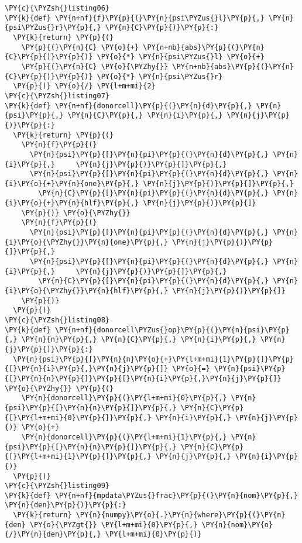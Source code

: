 \begin{Verbatim}[commandchars=\\\{\}]
\PY{c}{\PYZsh{}listing06}
\PY{k}{def} \PY{n+nf}{f}\PY{p}{(}\PY{n}{psi\PYZus{}l}\PY{p}{,} \PY{n}{psi\PYZus{}r}\PY{p}{,} \PY{n}{C}\PY{p}{)}\PY{p}{:}
  \PY{k}{return} \PY{p}{(}
    \PY{p}{(}\PY{n}{C} \PY{o}{+} \PY{n+nb}{abs}\PY{p}{(}\PY{n}{C}\PY{p}{)}\PY{p}{)} \PY{o}{*} \PY{n}{psi\PYZus{}l} \PY{o}{+} 
    \PY{p}{(}\PY{n}{C} \PY{o}{\PYZhy{}} \PY{n+nb}{abs}\PY{p}{(}\PY{n}{C}\PY{p}{)}\PY{p}{)} \PY{o}{*} \PY{n}{psi\PYZus{}r}
  \PY{p}{)} \PY{o}{/} \PY{l+m+mi}{2}
\PY{c}{\PYZsh{}listing07}
\PY{k}{def} \PY{n+nf}{donorcell}\PY{p}{(}\PY{n}{d}\PY{p}{,} \PY{n}{psi}\PY{p}{,} \PY{n}{C}\PY{p}{,} \PY{n}{i}\PY{p}{,} \PY{n}{j}\PY{p}{)}\PY{p}{:}
  \PY{k}{return} \PY{p}{(}
    \PY{n}{f}\PY{p}{(}
      \PY{n}{psi}\PY{p}{[}\PY{n}{pi}\PY{p}{(}\PY{n}{d}\PY{p}{,} \PY{n}{i}\PY{p}{,}     \PY{n}{j}\PY{p}{)}\PY{p}{]}\PY{p}{,} 
      \PY{n}{psi}\PY{p}{[}\PY{n}{pi}\PY{p}{(}\PY{n}{d}\PY{p}{,} \PY{n}{i}\PY{o}{+}\PY{n}{one}\PY{p}{,} \PY{n}{j}\PY{p}{)}\PY{p}{]}\PY{p}{,} 
        \PY{n}{C}\PY{p}{[}\PY{n}{pi}\PY{p}{(}\PY{n}{d}\PY{p}{,} \PY{n}{i}\PY{o}{+}\PY{n}{hlf}\PY{p}{,} \PY{n}{j}\PY{p}{)}\PY{p}{]}
    \PY{p}{)} \PY{o}{\PYZhy{}} 
    \PY{n}{f}\PY{p}{(}
      \PY{n}{psi}\PY{p}{[}\PY{n}{pi}\PY{p}{(}\PY{n}{d}\PY{p}{,} \PY{n}{i}\PY{o}{\PYZhy{}}\PY{n}{one}\PY{p}{,} \PY{n}{j}\PY{p}{)}\PY{p}{]}\PY{p}{,} 
      \PY{n}{psi}\PY{p}{[}\PY{n}{pi}\PY{p}{(}\PY{n}{d}\PY{p}{,} \PY{n}{i}\PY{p}{,}     \PY{n}{j}\PY{p}{)}\PY{p}{]}\PY{p}{,} 
        \PY{n}{C}\PY{p}{[}\PY{n}{pi}\PY{p}{(}\PY{n}{d}\PY{p}{,} \PY{n}{i}\PY{o}{\PYZhy{}}\PY{n}{hlf}\PY{p}{,} \PY{n}{j}\PY{p}{)}\PY{p}{]}
    \PY{p}{)} 
  \PY{p}{)}
\PY{c}{\PYZsh{}listing08}
\PY{k}{def} \PY{n+nf}{donorcell\PYZus{}op}\PY{p}{(}\PY{n}{psi}\PY{p}{,} \PY{n}{n}\PY{p}{,} \PY{n}{C}\PY{p}{,} \PY{n}{i}\PY{p}{,} \PY{n}{j}\PY{p}{)}\PY{p}{:}
  \PY{n}{psi}\PY{p}{[}\PY{n}{n}\PY{o}{+}\PY{l+m+mi}{1}\PY{p}{]}\PY{p}{[}\PY{n}{i}\PY{p}{,}\PY{n}{j}\PY{p}{]} \PY{o}{=} \PY{n}{psi}\PY{p}{[}\PY{n}{n}\PY{p}{]}\PY{p}{[}\PY{n}{i}\PY{p}{,}\PY{n}{j}\PY{p}{]} \PY{o}{\PYZhy{}} \PY{p}{(}
    \PY{n}{donorcell}\PY{p}{(}\PY{l+m+mi}{0}\PY{p}{,} \PY{n}{psi}\PY{p}{[}\PY{n}{n}\PY{p}{]}\PY{p}{,} \PY{n}{C}\PY{p}{[}\PY{l+m+mi}{0}\PY{p}{]}\PY{p}{,} \PY{n}{i}\PY{p}{,} \PY{n}{j}\PY{p}{)} \PY{o}{+}
    \PY{n}{donorcell}\PY{p}{(}\PY{l+m+mi}{1}\PY{p}{,} \PY{n}{psi}\PY{p}{[}\PY{n}{n}\PY{p}{]}\PY{p}{,} \PY{n}{C}\PY{p}{[}\PY{l+m+mi}{1}\PY{p}{]}\PY{p}{,} \PY{n}{j}\PY{p}{,} \PY{n}{i}\PY{p}{)}
  \PY{p}{)}
\PY{c}{\PYZsh{}listing09}
\PY{k}{def} \PY{n+nf}{mpdata\PYZus{}frac}\PY{p}{(}\PY{n}{nom}\PY{p}{,} \PY{n}{den}\PY{p}{)}\PY{p}{:}
  \PY{k}{return} \PY{n}{numpy}\PY{o}{.}\PY{n}{where}\PY{p}{(}\PY{n}{den} \PY{o}{\PYZgt{}} \PY{l+m+mi}{0}\PY{p}{,} \PY{n}{nom}\PY{o}{/}\PY{n}{den}\PY{p}{,} \PY{l+m+mi}{0}\PY{p}{)}

\end{Verbatim}
